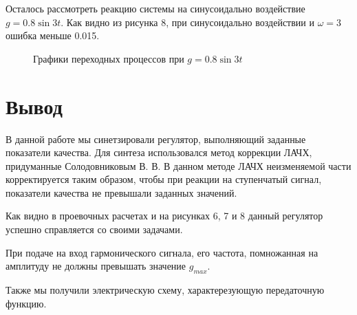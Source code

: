 \documentclass[russian, utf8]{eskdtext}
\begin{document}
Осталось рассмотреть реакцию системы на синусоидально воздействие $g = 0.8\sin{3t}$. Как видно из рисунка 8, при синусоидально воздействии и $\omega = 3$ ошибка меньше 0.015.
\begin{figure}[h!]
    \begin{subfigure} {0.5\textwidth}
    \end{subfigure}
    \begin{subfigure} {0.5\textwidth}
    \end{subfigure}
    \caption{Графики переходных процессов при $g = 0.8\sin{3t}$}
\end{figure}

\newpage
\section*{Вывод}
В данной работе мы синетзировали регулятор, выполняющий заданные показатели качества. Для синтеза использовался метод коррекции ЛАЧХ, придуманные Солодовниковым В. В. В данном методе ЛАЧХ неизменяемой части корректируется таким образом, чтобы при реакции на ступенчатый сигнал, показатели качества не превышали заданных значений. \par
Как видно в проевочных расчетах и на рисунках 6, 7 и 8 данный регулятор успешно справляется со своими задачами. \par
При подаче на вход гармонического сигнала, его частота, помножанная на амплитуду не должны превышать значение $g_{max}$. \par
Также мы получили электрическую схему, характерезующую передаточную функцию.
\end{document}
